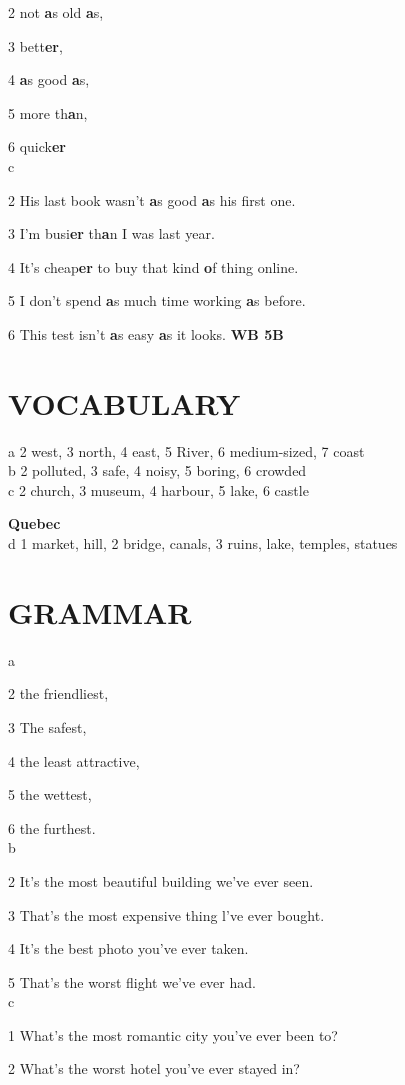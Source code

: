 \documentclass{article}
\begin{document}
2 not \textbf{a}s old \textbf{a}s, 

3 bett\textbf{er}, 

4 \textbf{a}s good \textbf{a}s,

5 more th\textbf{a}n, 

6 quick\textbf{er}
\\
c 

2 His last book wasn't \textbf{a}s good \textbf{a}s his
first one.

3 I'm busi\textbf{er} th\textbf{a}n I was last year.

4 It's cheap\textbf{er} to buy that kind \textbf{o}f thing online.

5 I don't spend \textbf{a}s much time working \textbf{a}s before.

6 This test isn't \textbf{a}s easy \textbf{a}s it looks.
\newpage
\textbf{WB 5B}
\section*{VOCABULARY}
a 2 west, 3 north, 4 east, 5 River, 6 medium-sized, 7 coast
\\
b 2 polluted, 3 safe, 4 noisy, 5 boring, 6 crowded
\\
c 2 church, 3 museum, 4 harbour, 5 lake, 6 castle

\textbf{Quebec}
\\
d 1 market, hill, 2 bridge, canals, 3 ruins, lake, temples, statues
\section*{GRAMMAR}
a 

2 the friendliest, 

3 The safest, 

4 the least attractive, 

5 the wettest, 

6 the furthest.
\\
b 

2 It's the most beautiful building we've ever seen.

3 That's the most expensive thing l've ever bought.

4 It's the best photo you've ever taken.

5 That's the worst flight we've ever had.
\\
c 

1 What's the most romantic city you've ever been to?

2 What's the worst hotel you've ever
stayed in?
\end{document}
